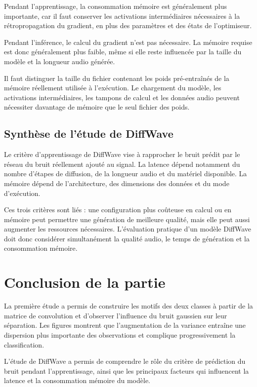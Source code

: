 Pendant l'apprentissage, la consommation mémoire est généralement plus importante, car il faut conserver les activations intermédiaires nécessaires à la rétropropagation du gradient, en plus des paramètres et des états de l'optimiseur.

Pendant l'inférence, le calcul du gradient n'est pas nécessaire. La mémoire requise est donc généralement plus faible, même si elle reste influencée par la taille du modèle et la longueur audio générée.

Il faut distinguer la taille du fichier contenant les poids pré-entraînés de la mémoire réellement utilisée à l'exécution. Le chargement du modèle, les activations intermédiaires, les tampons de calcul et les données audio peuvent nécessiter davantage de mémoire que le seul fichier des poids.

\subsection{Synthèse de l'étude de DiffWave}

Le critère d'apprentissage de DiffWave vise à rapprocher le bruit prédit par le réseau du bruit réellement ajouté au signal. La latence dépend notamment du nombre d'étapes de diffusion, de la longueur audio et du matériel disponible. La mémoire dépend de l'architecture, des dimensions des données et du mode d'exécution.

Ces trois critères sont liés : une configuration plus coûteuse en calcul ou en mémoire peut permettre une génération de meilleure qualité, mais elle peut aussi augmenter les ressources nécessaires. L'évaluation pratique d'un modèle DiffWave doit donc considérer simultanément la qualité audio, le temps de génération et la consommation mémoire.

\section*{Conclusion de la partie}

La première étude a permis de construire les motifs des deux classes à partir de la matrice de convolution et d'observer l'influence du bruit gaussien sur leur séparation. Les figures montrent que l'augmentation de la variance entraîne une dispersion plus importante des observations et complique progressivement la classification.

L'étude de DiffWave a permis de comprendre le rôle du critère de prédiction du bruit pendant l'apprentissage, ainsi que les principaux facteurs qui influencent la latence et la consommation mémoire du modèle.




